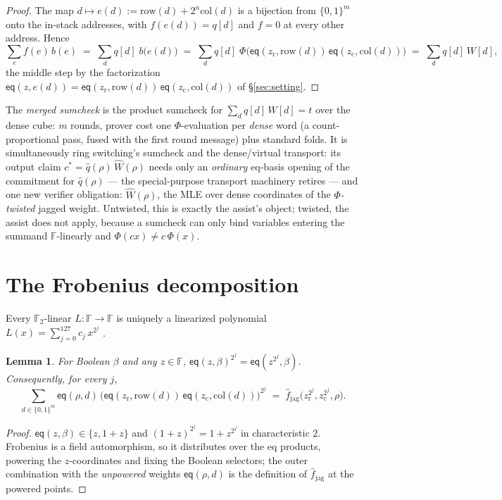 \documentclass[11pt]{article}
\newcommand{\F}{\mathbb{F}}
\newcommand{\Ftwo}{\F_2}
\newcommand{\eq}{\mathsf{eq}}
\newcommand{\rowof}{\mathrm{row}}
\newcommand{\colof}{\mathrm{col}}
\newcommand{\fjag}{\hat f_{\mathrm{jag}}}
\newtheorem{lemma}[theorem]{Lemma}
\begin{document}
\begin{proof}
The map $d \mapsto e(d) := \rowof(d) + 2^n \colof(d)$ is a bijection
from $\{0,1\}^m$ onto the in-stack addresses, with $f(e(d)) = q[d]$ and
$f = 0$ at every other address. Hence
\[
  \sum_{e} f(e)\, b(e)
  \;=\; \sum_{d} q[d]\; b\bigl(e(d)\bigr)
  \;=\; \sum_{d} q[d]\;
        \Phi\bigl(\eq(z_{\mathrm r}, \rowof(d))\,
                  \eq(z_{\mathrm c}, \colof(d))\bigr)
  \;=\; \sum_{d} q[d]\, W[d],
\]
the middle step by the factorization
$\eq(z, e(d)) = \eq(z_{\mathrm r}, \rowof(d))\,
\eq(z_{\mathrm c}, \colof(d))$ of \S\ref{sec:setting}.
\end{proof}

The \emph{merged sumcheck} is the product sumcheck for
$\sum_d q[d]\,W[d] = t$ over the dense cube: $m$ rounds, prover cost
one $\Phi$-evaluation per \emph{dense} word (a count-proportional
pass, fused with the first round message) plus standard folds. It is simultaneously ring switching's sumcheck and the
dense/virtual transport: its output claim
$c^* = \hat q(\rho)\,\widehat W(\rho)$ needs only an \emph{ordinary}
eq-basis opening of the commitment for $\hat q(\rho)$ --- the
special-purpose transport machinery retires --- and one new verifier
obligation: $\widehat W(\rho)$, the MLE over dense coordinates of the
\emph{$\Phi$-twisted} jagged weight. Untwisted, this is exactly the
assist's object; twisted, the assist does not apply, because a sumcheck
can only bind variables entering the summand $\F$-linearly and
$\Phi(cx) \ne c\,\Phi(x)$.

\section{The Frobenius decomposition}\label{sec:frobenius}

Every $\Ftwo$-linear $L : \F \to \F$ is uniquely a linearized
polynomial $L(x) = \sum_{j=0}^{127} c_j\, x^{2^j}$ \cite{ore,lidl}.

\begin{lemma}\label{lem:transport}
For Boolean $\beta$ and any $z \in \F$,
$\eq(z, \beta)^{2^j} = \eq(z^{2^j}, \beta)$. Consequently, for every
$j$,
\[
  \sum_{d \in \{0,1\}^m} \eq(\rho, d)\,
  \bigl(\eq(z_{\mathrm r}, \rowof(d))\,\eq(z_{\mathrm c}, \colof(d))\bigr)^{2^j}
  \;=\;
  \fjag\bigl(z_{\mathrm r}^{2^j}, z_{\mathrm c}^{2^j}, \rho\bigr).
\]
\end{lemma}

\begin{proof}
$\eq(z,\beta) \in \{z, 1{+}z\}$ and $(1{+}z)^{2^j} = 1 + z^{2^j}$ in
characteristic $2$. Frobenius is a field automorphism, so it
distributes over the eq products, powering the $z$-coordinates and
fixing the Boolean selectors; the outer combination with the
\emph{unpowered} weights $\eq(\rho, d)$ is the definition of $\fjag$
at the powered points.
\end{proof}
\end{document}
